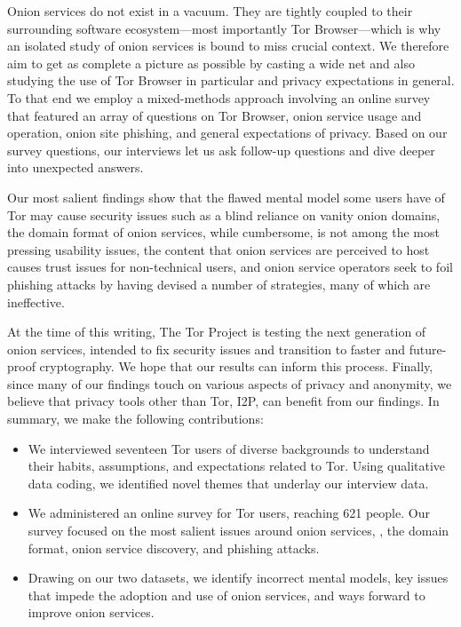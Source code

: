 Onion services do not exist in a vacuum.  They are tightly coupled to their
surrounding software ecosystem---most importantly Tor Browser---which is why an
isolated study of onion services is bound to miss crucial context.  We therefore
aim to get as complete a picture as possible by casting a wide net and also
studying the use of Tor Browser in particular and privacy expectations in
general.  To that end we employ a mixed-methods approach involving an online
survey that featured an array of questions on Tor Browser, onion service usage
and operation, onion site phishing, and general expectations of privacy.  Based
on our survey questions, our interviews let us ask follow-up questions and dive
deeper into unexpected answers.

Our most salient findings show that \first the flawed mental model some users
have of Tor may cause security issues such as a blind reliance on vanity onion
domains, \second the domain format of onion services, while cumbersome, is not
among the most pressing usability issues, \third the content that onion services
are perceived to host causes trust issues for non-technical users, and \fourth
onion service operators seek to foil phishing attacks by having devised a number
of strategies, many of which are ineffective.

At the time of this writing, The Tor Project is testing the next generation of
onion services, intended to fix security issues and transition to faster and
future-proof cryptography.  We hope that our results can inform this process.
Finally, since many of our findings touch on various aspects of privacy and
anonymity, we believe that privacy tools other than Tor, \eg I2P, can benefit
from our findings.  In summary, we make the following contributions:

\begin{itemize}
    \item We interviewed seventeen Tor users of diverse backgrounds to
        understand their habits, assumptions, and expectations related to Tor.
        Using qualitative data coding, we identified novel themes that underlay
        our interview data.

    \item We administered an online survey for Tor users, reaching 621 people.
        Our survey focused on the most salient issues around onion services,
        \eg, the domain format, onion service discovery, and phishing attacks.

    \item Drawing on our two datasets, we identify \first incorrect mental
        models, \second key issues that impede the adoption and use of onion
        services, and \third ways forward to improve onion services.
\end{itemize}

